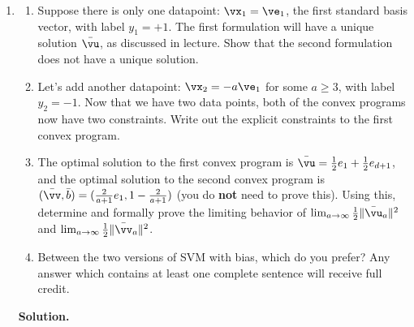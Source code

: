 \documentclass{article}
\theoremstyle{definition}
\theoremstyle{remark}
\newenvironment{Q}
{%
\clearpage
\item
}
{%
\phantom{s}%
\bigskip%
\noindent\textbf{Solution.}
}
\begin{document}
\begin{enumerate}[font={\Large\bfseries},left=0pt]
\begin{Q}
\begin{enumerate}
    \item
      Suppose there is only one datapoint: $\vx_1 = \ve_1$, the first standard basis vector, 
      with label $y_1 = +1$.
      The first formulation will have a unique solution $\bar\vu$, as discussed in lecture.
      Show that the second formulation does not have a unique solution.

    \item
      Let's add another datapoint: $\vx_2 = -a\ve_1$ for some $a\geq 3$, with label $y_2 = -1$.
      Now that we have two data points, both of the convex programs now have two constraints.
      Write out the explicit constraints to the first convex program.

    \item
      The optimal solution to the first convex program is $\bar\vu=\frac 1 2 e_1 + \frac 1 2 e_{d+1}$,
      and the optimal solution to the second convex program is $(\bar\vv,\bar b)=(\frac{2}{a+1}e_1, 1-\frac{2}{a+1})$ (you do \textbf{not} need to prove this).
      Using this, determine and formally prove the limiting behavior of
      $\lim_{a\to\infty}\frac 1 2 \|\bar\vu_a\|^2$ and $\lim_{a\to\infty}\frac 1 2 \|\bar\vv_a\|^2$.

    \item
      Between the two versions of SVM with bias, which do you prefer?
      Any answer which contains at least one complete sentence will receive full credit.


\end{enumerate}
\end{Q}
\end{enumerate}
\end{document}
